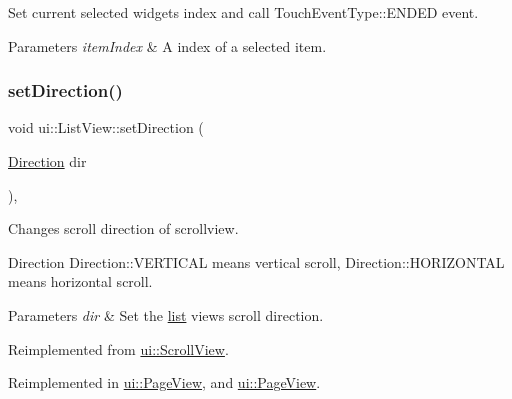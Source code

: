 Set current selected widget\textquotesingle{}s index and call Touch\+Event\+Type\+::\+E\+N\+D\+ED event. 


\begin{DoxyParams}{Parameters}
{\em item\+Index} & A index of a selected item. \\
\hline
\end{DoxyParams}
\mbox{\label{classui_1_1ListView_aaac3381602537a823529058b64bffabf}} 
\subsubsection{\texorpdfstring{set\+Direction()}{setDirection()}\hspace{0.1cm}{\footnotesize\ttfamily [1/2]}}
{\footnotesize\ttfamily void ui\+::\+List\+View\+::set\+Direction (\begin{DoxyParamCaption}\item[{\hyperlink{classui_1_1ScrollView_aed2d778ae8098dcafe323b2beae8dd6b}{Direction}}]{dir }\end{DoxyParamCaption})\hspace{0.3cm}{\ttfamily [override]}, {\ttfamily [virtual]}}

Changes scroll direction of scrollview.

Direction Direction\+::\+V\+E\+R\+T\+I\+C\+AL means vertical scroll, Direction\+::\+H\+O\+R\+I\+Z\+O\+N\+T\+AL means horizontal scroll. 
\begin{DoxyParams}{Parameters}
{\em dir} & Set the \hyperlink{protocollist-p}{list} view\textquotesingle{}s scroll direction. \\
\hline
\end{DoxyParams}


Reimplemented from \hyperlink{classui_1_1ScrollView_a7b30815b6ca380b56c974b6c0b6aa78e}{ui\+::\+Scroll\+View}.



Reimplemented in \hyperlink{classui_1_1PageView_a4ac6e8672026f60e326ffc054d167365}{ui\+::\+Page\+View}, and \hyperlink{classui_1_1PageView_a594124394d2bc1dff86069b87939b14c}{ui\+::\+Page\+View}.

\mbox{\label{classui_1_1ListView_aa4999666131727cdb1a32f13957914e3}} 
